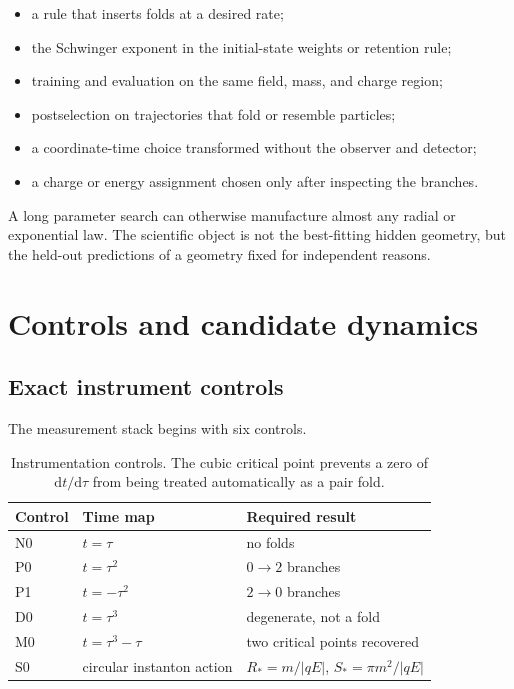 \documentclass[aps,prd,reprint,nofootinbib,longbibliography]{revtex4-2}
\newcommand{\dd}{\mathrm{d}}
\begin{document}
\begin{itemize}[leftmargin=1.5em]
\item a rule that inserts folds at a desired rate;
\item the Schwinger exponent in the initial-state weights or retention rule;
\item training and evaluation on the same field, mass, and charge region;
\item postselection on trajectories that fold or resemble particles;
\item a coordinate-time choice transformed without the observer and detector;
\item a charge or energy assignment chosen only after inspecting the branches.
\end{itemize}

A long parameter search can otherwise manufacture almost any radial or exponential
law.  The scientific object is not the best-fitting hidden geometry, but the
held-out predictions of a geometry fixed for independent reasons.

\section{Controls and candidate dynamics}

\subsection{Exact instrument controls}

The measurement stack begins with six controls.

\begin{table}[h]
\caption{Instrumentation controls.  The cubic critical point prevents a zero of
$\dd t/\dd\tau$ from being treated automatically as a pair fold.}
\begin{ruledtabular}
\begin{tabular}{lll}
Control & Time map & Required result \\
\hline
N0 & $t=\tau$ & no folds \\
P0 & $t=\tau^2$ & $0\rightarrow 2$ branches \\
P1 & $t=-\tau^2$ & $2\rightarrow 0$ branches \\
D0 & $t=\tau^3$ & degenerate, not a fold \\
M0 & $t=\tau^3-\tau$ & two critical points recovered \\
S0 & circular instanton action & $R_*=m/|qE|$, $S_*=\pi m^2/|qE|$ \\
\end{tabular}
\end{ruledtabular}
\end{table}
\end{document}
